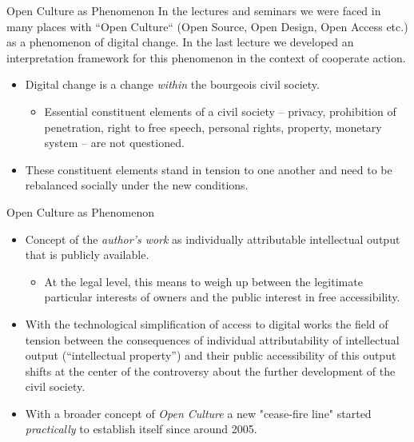 \documentclass{beamer}
\title{Modelling Sustainable Systems\\ and Semantic Web\\[6pt] Open Culture
  \vskip1em}
\subtitle{Lecture in the Module 10-202-2309\\ for Master Computer Science}
\author{Prof. Dr. Hans-Gert Gräbe\\
\url{http://www.informatik.uni-leipzig.de/~graebe}}
\date{July 2021}
\begin{document}
{
\begin{frame}
  \titlepage
\end{frame}}

\begin{frame}{Open Culture as Phenomenon}  
In the lectures and seminars we were faced in many places with “Open Culture“
(Open Source, Open Design, Open Access etc.) as a phenomenon of digital
change. In the last lecture we developed an interpretation framework for this
phenomenon in the context of cooperate action.
\begin{itemize}
\item Digital change is a change \emph{within} the bourgeois civil society.
  \begin{itemize}
  \item Essential constituent elements of a civil society -- privacy,
    prohibition of penetration, right to free speech, personal rights,
    property, monetary system -- are not questioned.
  \end{itemize}
\item These constituent elements stand in tension to one another and need to
  be rebalanced socially under the new conditions.
\end{itemize}
\end{frame}

\begin{frame}{Open Culture as Phenomenon} 
\begin{itemize} 
\item Concept of the \emph{author's work} as individually attributable
  intellectual output that is publicly available. 
  \begin{itemize} 
  \item At the legal level, this means to weigh up between the legitimate
    particular interests of owners and the public interest in free
    accessibility.
  \end{itemize}
\item With the technological simplification of access to digital works the
  field of tension between the consequences of individual attributability of
  intellectual output (“intellectual property”) and their public accessibility
  of this output shifts at the center of the controversy about the further
  development of the civil society.
\item With a broader concept of \emph{Open Culture} a new "cease-fire line"
  started \emph{practically} to establish itself since around 2005.
\end{itemize}
\end{frame}
\end{document}
